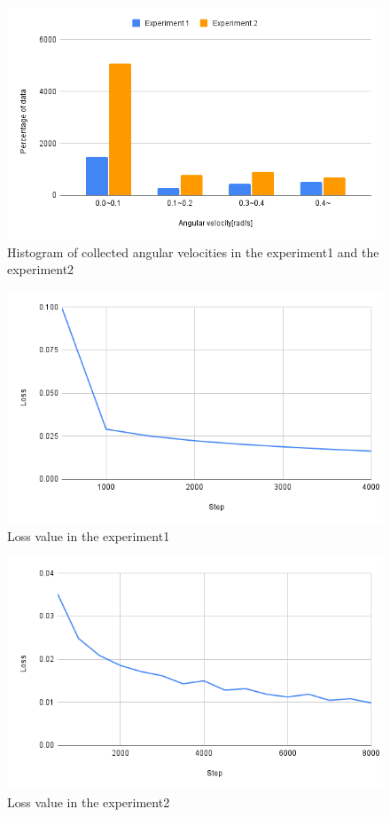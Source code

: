 \newpage
\begin{figure}[h]
  \centering
  \includegraphics[keepaspectratio, scale=0.53]{images/ang_sum.png}
  \caption{Histogram of collected angular velocities in the experiment1 and the experiment2}
  \label{Fig:hist}
  \end{figure}

\begin{figure}[h]
  \centering
  \includegraphics[keepaspectratio, scale=0.5]{images/exp3_4000.png}
  \caption{Loss value in the experiment1}
  \label{Fig:exp2.2-4000}
  \end{figure}

\begin{figure}[h]
  \centering
  \includegraphics[keepaspectratio, scale=0.5]{images/exp3_8000.png}
  \caption{Loss value in the experiment2}
  \label{Fig:exp2.2-8000}
  \end{figure}

